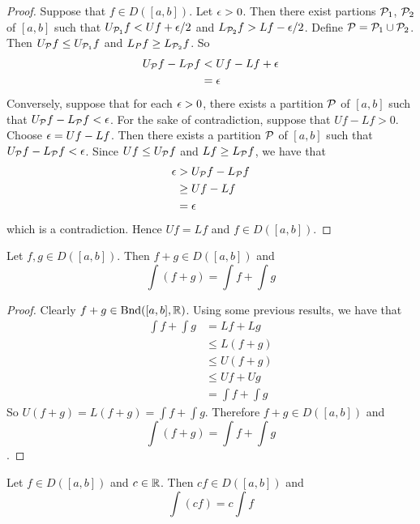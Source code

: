 \documentclass{book}
\begin{document}
	\begin{proof}
		Suppose that $f \in D([a,b])$. Let $\epsilon >0$. Then there exist partions $\mathcal{P}_1$, $\mathcal{P}_2$ of $[a,b]$ such that $U_{\mathcal{P}_1} f < Uf + \epsilon/2$ and $L_{\mathcal{P}_2} f > Lf - \epsilon/2$. Define $\mathcal{P} = \mathcal{P}_1 \cup \mathcal{P}_2$. Then $U_{\mathcal{P}} f \leq U_{\mathcal{P}_1} f$ and $L_P f \geq L_{\mathcal{P}_2}f$. So  
		\begin{align*}
			U_{\mathcal{P}} f - L_{\mathcal{P}} f 
			&< Uf - L f + \epsilon \\
			&= \epsilon
		\end{align*}  
		Conversely, suppose that for each $\epsilon >0$, there exists a partition $\mathcal{P}$ of $[a,b]$ such that $U_{\mathcal{P}} f - L_{\mathcal{P}} f < \epsilon$. For the sake of contradiction, suppose that $Uf - Lf > 0$. Choose $\epsilon = Uf - Lf$. Then there exists a partition $\mathcal{P}$ of $[a,b]$ such that $U_{\mathcal{P}} f - L_{\mathcal{P}} f < \epsilon$. Since $Uf \leq U_{\mathcal{P}} f$ and $Lf \geq L_{\mathcal{P}} f$, we have that 
		\begin{align*}
			\epsilon 
			&> U_{\mathcal{P}} f - L_{\mathcal{P}} f \\
			&\geq Uf - Lf \\
			&= \epsilon
		\end{align*} 
		which is a contradiction. Hence $Uf = Lf$ and $f \in D([a,b])$.
	\end{proof}

	\begin{ex}  
		Let $f, g \in D([a,b])$. Then $f+g \in D([a,b])$ and $$\int (f+g) = \int f + \int g$$
	\end{ex}
	
	\begin{proof}
		Clearly $f+g \in \text{Bnd}([a,b], \mathbb{R})$. Using some previous results, we have that 
		\begin{align*}
			\int f + \int g 
			&= Lf + Lg \\
			&\leq L(f+g) \\
			&\leq U(f+g) \\
			&\leq Uf + Ug \\
			&= \int f + \int g
		\end{align*}
		So $U(f+g) = L(f+g) = \int f + \int g$. Therefore $f+g \in D([a,b])$ and $$\int (f+g) = \int f + \int g$$.
	\end{proof}

	\begin{ex}  
		Let $f \in D([a,b])$ and $c \in \mathbb{R}$. Then $cf \in D([a,b])$ and $$\int (cf) = c \int f $$
	\end{ex}
\end{document}
